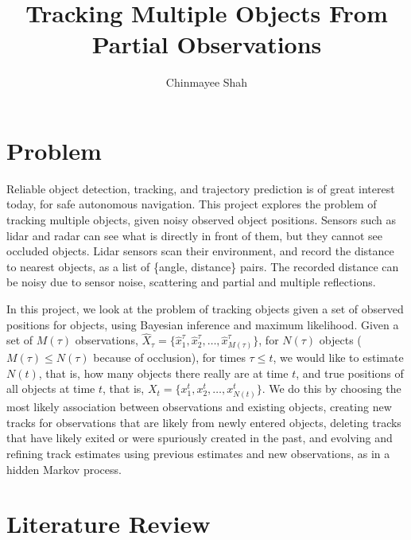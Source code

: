 \documentclass[a4paper]{article}
\title{Tracking Multiple Objects From Partial Observations}
\author{Chinmayee Shah}
\newcommand{\x}{\hat{x}}
\newcommand{\X}{\hat{X}}
\begin{document}
\maketitle

\section{Problem}

Reliable object detection, tracking, and trajectory prediction is of great
interest today, for safe autonomous navigation.
This project explores the problem of tracking multiple objects, given
noisy observed object positions.
Sensors such as lidar and radar can see what is directly in front of them,
but they cannot see occluded objects.
Lidar sensors scan their environment, and record the distance to
nearest objects, as a list of \{angle, distance\} pairs.
The recorded distance can be noisy due to sensor noise, scattering and
partial and multiple reflections.

In this project, we look at the problem of tracking objects given a set of
observed positions for objects, using Bayesian inference and maximum 
likelihood.
Given a set of $M(\tau)$ observations,
$\X_\tau = \{\x^\tau_1, \x^\tau_2, \ldots, \x^\tau_{M(\tau)}\}$,
for $N(\tau)$ objects ($M(\tau) \leq N(\tau)$ because of occlusion),
for times $\tau \leq t$,
we would like to estimate $N(t)$, that is, how many objects there
really are at time $t$, and true positions of all objects at time $t$, that is,
$X_t = \{x^t_1, x^t_2, \ldots, x^t_{N(t)}\}$.
We do this by choosing the most likely association between observations and
existing objects, creating new tracks for observations that are likely from
newly entered objects, deleting tracks that have likely exited or were
spuriously created in the past, and
evolving and refining track estimates using previous estimates and new
observations, as in a hidden Markov process.


\section{Literature Review}
\end{document}
